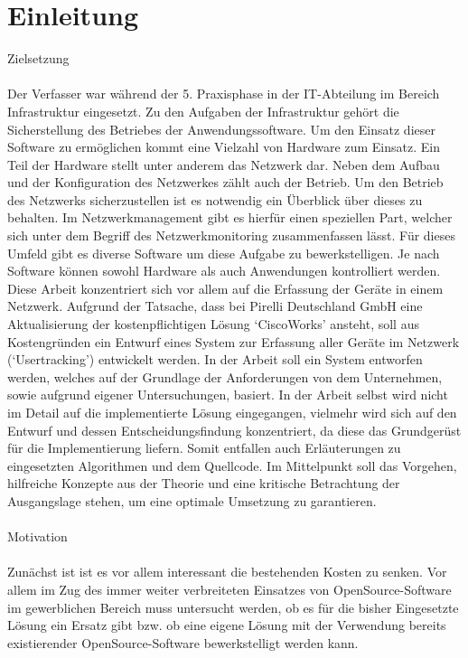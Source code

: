 \chapter{Einleitung}
\label{cha:Einleitung}

Zielsetzung\\
\\
Der Verfasser war während der 5. Praxisphase in der IT-Abteilung im Bereich Infrastruktur eingesetzt.
Zu den Aufgaben der Infrastruktur gehört die Sicherstellung des Betriebes der Anwendungssoftware. Um den Einsatz dieser Software zu ermöglichen kommt eine Vielzahl von Hardware zum Einsatz. Ein Teil der Hardware stellt unter anderem das Netzwerk dar. Neben dem Aufbau und der Konfiguration des Netzwerkes zählt auch der Betrieb. Um den Betrieb des Netzwerks sicherzustellen ist es notwendig ein Überblick über dieses zu behalten.
Im Netzwerkmanagement gibt es hierfür einen speziellen Part, welcher sich unter dem Begriff des Netzwerkmonitoring zusammenfassen lässt. Für dieses Umfeld gibt es diverse Software um diese Aufgabe zu bewerkstelligen. Je nach Software können sowohl Hardware als auch Anwendungen kontrolliert werden. Diese Arbeit konzentriert sich vor allem auf die Erfassung der Geräte in einem Netzwerk. Aufgrund der Tatsache, dass bei Pirelli Deutschland GmbH eine Aktualisierung der kostenpflichtigen Lösung ‘CiscoWorks’ ansteht, soll aus Kostengründen ein Entwurf eines System zur Erfassung aller Geräte im Netzwerk (‘Usertracking’) entwickelt werden.
In der Arbeit soll ein System entworfen werden, welches auf der Grundlage der Anforderungen von dem Unternehmen, sowie aufgrund eigener Untersuchungen, basiert. In der Arbeit selbst wird nicht im Detail auf die implementierte Lösung eingegangen, vielmehr wird sich auf den Entwurf und dessen Entscheidungsfindung konzentriert, da diese das Grundgerüst für die Implementierung liefern. Somit entfallen auch Erläuterungen zu eingesetzten Algorithmen und dem Quellcode.
Im Mittelpunkt soll das Vorgehen, hilfreiche Konzepte aus der Theorie und eine kritische Betrachtung der Ausgangslage stehen, um eine optimale Umsetzung zu garantieren.\\
\\
Motivation\\
\\
Zunächst ist ist es vor allem interessant die bestehenden Kosten zu senken. Vor allem im Zug des immer weiter verbreiteten Einsatzes von OpenSource-Software im gewerblichen Bereich muss untersucht werden, ob es für die bisher Eingesetzte Lösung ein Ersatz gibt bzw. ob eine eigene Lösung mit der Verwendung bereits existierender OpenSource-Software bewerkstelligt werden kann.
